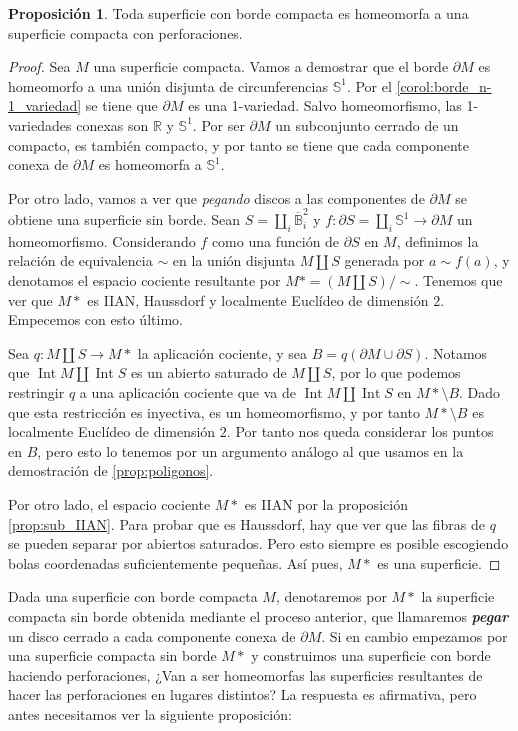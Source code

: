 \documentclass[10pt]{report}
\newcommand{\R}{\mathbb{R}}
\DeclareMathOperator{\interior}{Int} %
\newcommand{\enfatiza}[1]{\textbf{\textit{#1}}}
\theoremstyle{definition}
\newtheorem{prop}[defin]{Proposición}
\begin{document}
\begin{prop}\label{prop:borde_perforaciones}
Toda superficie con borde compacta es homeomorfa a una superficie compacta con perforaciones.
\end{prop}
\begin{proof}
Sea $M$ una superficie compacta. Vamos a demostrar que el borde $\partial M$ es homeomorfo a una unión disjunta de circunferencias $\mathbb{S}^1$. Por el \autoref{corol:borde_n-1_variedad} se tiene que $\partial M$ es una 1-variedad. Salvo homeomorfismo, las 1-variedades conexas son $\R$ y $\mathbb{S}^1$. Por ser $\partial M$ un subconjunto cerrado de un compacto, es también compacto, y por tanto se tiene que cada componente conexa de $\partial M$ es homeomorfa a $\mathbb{S}^1$.

Por otro lado, vamos a ver que \textit{pegando} discos a las componentes de $\partial M$ se obtiene una superficie sin borde. Sean $S=\amalg_i \overline{\mathbb{B}}_i^2$ y $f:\partial S=\amalg_i \mathbb{S}^1\to \partial M$ un homeomorfismo. Considerando $f$ como una función de $\partial S$ en $M$, definimos la relación de equivalencia $\sim$ en la unión disjunta $M\amalg S$ generada por $a\sim f(a)$, y denotamos el espacio cociente resultante por $M*=(M\amalg S)/\sim$. Tenemos que ver que $M*$ es IIAN, Haussdorf y localmente Euclídeo de dimensión $2$. Empecemos con esto último. 

Sea $q:M\amalg S\to M*$ la aplicación cociente, y sea $B=q(\partial M\cup \partial S)$. Notamos que $\interior M\amalg \interior S$ es un abierto saturado de $M\amalg S$, por lo que podemos restringir $q$ a una aplicación cociente que va de $\interior M\amalg \interior S$ en $M*\setminus B$. Dado que esta restricción es inyectiva, es un homeomorfismo, y por tanto $M*\setminus B$ es localmente Euclídeo de dimensión $2$. Por tanto nos queda considerar los puntos en $B$, pero esto lo tenemos por un argumento análogo al que usamos en la demostración de \autoref{prop:poligonos}. 

Por otro lado, el espacio cociente $M*$ es IIAN por la proposición \autoref{prop:sub_IIAN}. Para probar que es Haussdorf, hay que ver que las fibras de $q$ se pueden separar por abiertos saturados. Pero esto siempre es posible escogiendo bolas coordenadas suficientemente pequeñas. Así pues, $M*$ es una superficie. 
\end{proof}

Dada una superficie con borde compacta $M$, denotaremos por $M*$ la superficie compacta sin borde obtenida mediante el proceso anterior, que llamaremos \enfatiza{pegar} un disco cerrado a cada componente conexa de $\partial M$. Si en cambio empezamos por una superficie compacta sin borde $M*$ y construimos una superficie con borde haciendo perforaciones, ¿Van a ser homeomorfas las superficies resultantes de hacer las perforaciones en lugares distintos? La respuesta es afirmativa, pero antes necesitamos ver la siguiente proposición:
\end{document}

